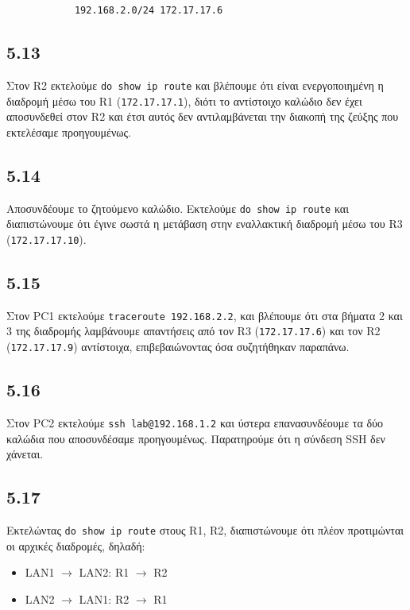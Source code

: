 \documentclass[a4paper, 12pt]{article}
\begin{document}
		\begin{verbatim}
			192.168.2.0/24 172.17.17.6
		\end{verbatim}

	\subsection*{5.13}
		Στον R2 εκτελούμε \verb|do show ip route| και βλέπουμε ότι είναι ενεργοποιημένη η διαδρομή μέσω του R1 (\verb|172.17.17.1|), διότι το αντίστοιχο καλώδιο δεν έχει αποσυνδεθεί στον R2 και έτσι αυτός δεν αντιλαμβάνεται την διακοπή της ζεύξης που εκτελέσαμε προηγουμένως.

	\subsection*{5.14}
		Αποσυνδέουμε το ζητούμενο καλώδιο. Εκτελούμε \verb|do show ip route| και διαπιστώνουμε ότι έγινε σωστά η μετάβαση στην εναλλακτική διαδρομή μέσω του R3 (\verb|172.17.17.10|).

	\subsection*{5.15}
		Στον PC1 εκτελούμε \verb|traceroute 192.168.2.2|, και βλέπουμε ότι στα βήματα 2 και 3 της διαδρομής λαμβάνουμε απαντήσεις από τον R3 (\verb|172.17.17.6|) και τον R2 (\verb|172.17.17.9|) αντίστοιχα, επιβεβαιώνοντας όσα συζητήθηκαν παραπάνω. 

	\subsection*{5.16}
		Στον PC2 εκτελούμε \verb|ssh lab@192.168.1.2| και ύστερα επανασυνδέουμε τα δύο καλώδια που αποσυνδέσαμε προηγουμένως. Παρατηρούμε ότι η σύνδεση SSH δεν χάνεται.

	\subsection*{5.17}
		Εκτελώντας \verb|do show ip route| στους R1, R2, διαπιστώνουμε ότι πλέον προτιμώνται οι αρχικές διαδρομές, δηλαδή:
		
		\begin{itemize}
			\item LAN1 $\rightarrow$ LAN2: R1 $\rightarrow$ R2
			\item LAN2 $\rightarrow$ LAN1: R2 $\rightarrow$ R1
		\end{itemize}
		
\end{document}

